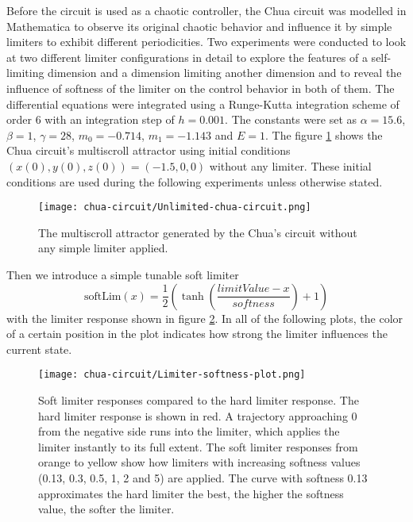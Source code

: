 \documentclass[main]{subfiles}
\begin{document}
Before the circuit is used as a chaotic controller, the Chua circuit was modelled in Mathematica to observe its original chaotic behavior and influence it by simple limiters to exhibit different periodicities. Two experiments were conducted to look at two different limiter configurations in detail to explore the features of a self-limiting dimension and a dimension limiting another dimension and to reveal the influence of softness of the limiter on the control behavior in both of them. The differential equations were integrated using a Runge-Kutta integration scheme of order 6 with an integration step of \(h=0.001\). The constants were set as \(\alpha = 15.6\), \(\beta = 1\), \(\gamma = 28\), \(m_0 = -0.714\), \(m_1 = -1.143\) and \(E = 1\). The figure \ref{figure:chaoticchuacircuit} shows the Chua circuit's multiscroll attractor using initial conditions \((x(0),y(0),z(0)) = (-1.5,0,0)\) without any limiter. These initial conditions are used during the following experiments unless otherwise stated.

\begin{figure}[H]
\centering
\texttt{[image: chua-circuit/Unlimited-chua-circuit.png]}
\caption[The multiscroll attractor in the Chua circuit]{The multiscroll attractor generated by the Chua's circuit without any simple limiter applied.}
\label{figure:chaoticchuacircuit}
\end{figure}

Then we introduce a simple tunable soft limiter \[\text{softLim}(x) = \frac{1}{2} \left(\tanh\left(\frac{limitValue - x}{softness}\right) + 1\right)\] with the limiter response shown in figure \ref{figure:softlimiterresponse}. In all of the following plots, the color of a certain position in the plot indicates how strong the limiter influences the current state.

\begin{figure}[H]
\centering
\texttt{[image: chua-circuit/Limiter-softness-plot.png]}
\caption[Soft limiter responses]{Soft limiter responses compared to the hard limiter response. The hard limiter response is shown in red. A trajectory approaching 0 from the negative side runs into the limiter, which applies the limiter instantly to its full extent. The soft limiter responses from orange to yellow show how limiters with increasing softness values (0.13, 0.3, 0.5, 1, 2 and 5) are applied. The curve with softness 0.13 approximates the hard limiter the best, the higher the softness value, the softer the limiter.}
\label{figure:softlimiterresponse}
\end{figure}
\end{document}
